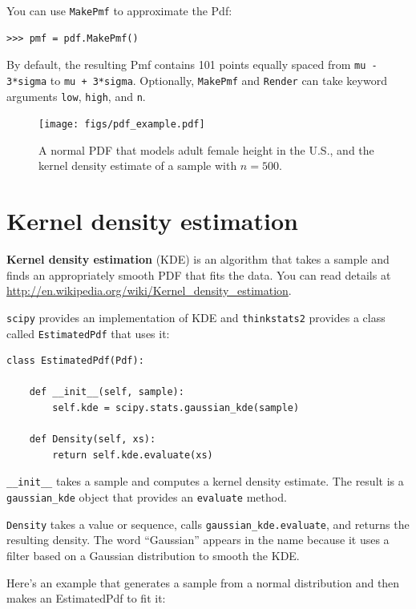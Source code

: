 \documentclass[12pt]{book}
\theoremstyle{exercise}
\begin{document}
You can use {\tt MakePmf} to approximate the Pdf:

\begin{verbatim}
>>> pmf = pdf.MakePmf()
\end{verbatim}

By default, the resulting Pmf contains 101 points equally spaced from
{\tt mu - 3*sigma} to {\tt mu + 3*sigma}.  Optionally, {\tt MakePmf}
and {\tt Render} can take keyword arguments {\tt low}, {\tt high},
and {\tt n}.

\begin{figure}
\centerline{\texttt{[image: figs/pdf\_example.pdf]}}
\caption{A normal PDF that models adult female height in the U.S.,
and the kernel density estimate of a sample with $n=500$.}%
\label{pdf_example}
\end{figure}


\section{Kernel density estimation} 

{\bf Kernel density estimation} (KDE) is an algorithm that takes
a sample and finds an appropriately smooth PDF that fits 
the data.  You can read details at
\url{http://en.wikipedia.org/wiki/Kernel_density_estimation}.%
%

{\tt scipy} provides an implementation of KDE and {\tt thinkstats2}
provides a class called {\tt EstimatedPdf} that uses it:%
%

\begin{verbatim}
class EstimatedPdf(Pdf):

    def __init__(self, sample):
        self.kde = scipy.stats.gaussian_kde(sample)

    def Density(self, xs):
        return self.kde.evaluate(xs)
\end{verbatim}

\verb"__init__" takes a sample
and computes a kernel density estimate.  The result is a
\verb"gaussian_kde" object that provides an {\tt evaluate}
method.

{\tt Density} takes a value or sequence, calls
\verb"gaussian_kde.evaluate", and returns the resulting density.  The
word ``Gaussian'' appears in the name because it uses a filter based
on a Gaussian distribution to smooth the KDE.%

Here's an example that generates a sample from a normal
distribution and then makes an EstimatedPdf to fit it:%
%
\end{document}
